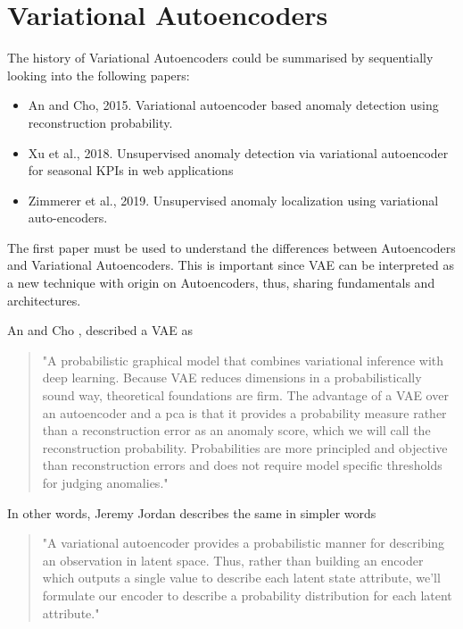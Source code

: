 \section{Variational Autoencoders}

The history of Variational Autoencoders could be summarised by sequentially looking into the following papers:

\begin{itemize}
    \item An and Cho, 2015. Variational autoencoder based anomaly detection using reconstruction probability. \cite{ancho}
    \item Xu et al., 2018. Unsupervised anomaly detection via variational autoencoder for seasonal KPIs in web applications \cite{xuetal}
    \item Zimmerer et al., 2019. Unsupervised anomaly localization using variational auto-encoders. \cite{zimmereretal}
\end{itemize}

The first paper must be used to understand the differences between Autoencoders and Variational Autoencoders. This is important since VAE can be interpreted as a new technique with origin on Autoencoders, thus, sharing fundamentals and architectures.

An and Cho \cite{ancho}, described a VAE as 

\begin{quote}
    "A probabilistic graphical model that combines variational inference with deep learning. Because VAE reduces dimensions in a probabilistically sound way, theoretical foundations are firm. The advantage of a VAE over an autoencoder and a \acrshort{pca} is that it provides a probability measure rather than a reconstruction error as an anomaly score, which we will call the reconstruction probability. Probabilities are more principled and objective than reconstruction errors and does not require model specific thresholds for judging anomalies."    
\end{quote}

In other words, Jeremy Jordan \cite{jjordan} describes the same in simpler words 

\begin{quote}
    "A variational autoencoder provides a probabilistic manner for describing an observation in latent space. Thus, rather than building an encoder which outputs a single value to describe each latent state attribute, we'll formulate our encoder to describe a probability distribution for each latent attribute."
\end{quote}

